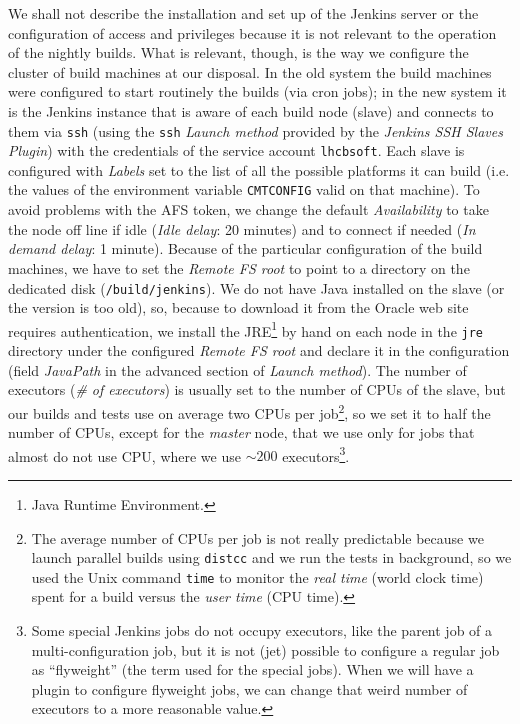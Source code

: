 We shall not describe the installation and set up of the Jenkins server or the
configuration of access and privileges because it is not relevant to the
operation of the nightly builds.  What is relevant, though, is the way we
configure the cluster of build machines at our disposal.  In the old system the
build machines were configured to start routinely the builds (via cron jobs); in
the new system it is the Jenkins instance that is aware of each build node
(slave) and connects to them via \texttt{ssh} (using the \texttt{ssh}
\emph{Launch method} provided by the \emph{Jenkins SSH Slaves Plugin}) with the
credentials of the service account \texttt{lhcbsoft}.  Each slave is configured
with \emph{Labels} set to the list of all the possible platforms it can build
(i.e. the values of the environment variable \texttt{CMTCONFIG} valid on that
machine). To avoid problems with the AFS token, we change the default
\emph{Availability} to take the node off line if idle (\emph{Idle delay}: 20
minutes) and to connect if needed (\emph{In demand delay}: 1 minute).  Because
of the particular configuration of the build machines, we have to set the
\emph{Remote FS root} to point to a directory on the dedicated disk
(\texttt{/build/jenkins}).  We do not have Java installed on the slave (or the
version is too old), so, because to download it from the Oracle web site
requires authentication, we install the JRE\footnote{Java Runtime
Environment\cite{JRE}.} by hand on each node in the \texttt{jre} directory under
the configured \emph{Remote FS root} and declare it in the configuration (field
\emph{JavaPath} in the advanced section of \emph{Launch method}).  The number of
executors (\emph{\# of executors}) is usually set to the number of CPUs of the
slave, but our builds and tests use on average two CPUs per job\footnote{The
average number of CPUs per job is not
  really predictable because we launch parallel builds using
  \texttt{distcc}\cite{distcc,distccCERN} and we run the tests in background, so
  we used the Unix command \texttt{time} to monitor the \emph{real time} (world
  clock time) spent for a build versus the \emph{user time} (CPU time).},
so we set it to half the number of CPUs, except for the \emph{master} node, that
we use only for jobs that almost do not use CPU, where we use $\sim200$
executors\footnote{Some special Jenkins jobs do not occupy executors, like the
parent job of a multi-configuration job, but it is not (jet) possible to
configure a regular job as ``flyweight'' (the term used for the special jobs).
When we will have a plugin to configure flyweight jobs, we can change that weird
number of executors to a more reasonable value.}.

